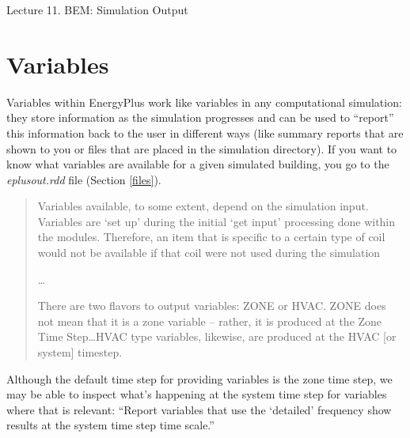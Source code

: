 \documentclass[10pt]{article}
\begin{document}
   \noindent
   \begin{center}

   \hrulefill
   
   \vspace{5pt}
   
   \vspace{0pt}
   
   {\Large \hfill  Lecture 11. BEM: Simulation Output}
   \vspace{5pt}
   
  
   \hrulefill
   \end{center}

{}

\section{Variables}

Variables within EnergyPlus work like variables in any computational simulation: they store information as the simulation progresses and can be used to ``report'' this information back to the user in different ways (like summary reports that are shown to you or files that are placed in the simulation directory). If you want to know what variables are available for a given simulated building, you go to the \textit{eplusout.rdd} file (Section \ref{files}).

\begin{quote}
Variables available, to some extent, depend on the simulation input. Variables are `set up' during the initial `get input' processing done within the modules. Therefore, an item that is specific to a certain type of coil would not be available if that coil were not used during the simulation

\ldots

There are two flavors to output variables: ZONE or HVAC. ZONE does not mean that it is a zone variable -- rather, it is produced at the Zone Time Step\ldots HVAC type variables, likewise, are produced at the HVAC [or system] timestep. \cite{EP9docs}
\end{quote}


Although the default time step for providing variables is the zone time step, we may be able to inspect what's happening at the system time step for variables where that is relevant: ``Report variables that
use the `detailed' frequency show results at the system time step time scale.'' \cite{EPdocs9engineering}
\end{document}

